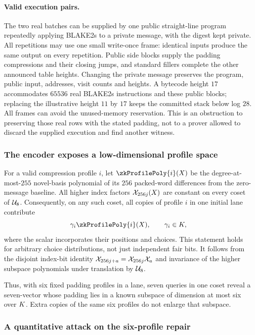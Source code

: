 \paragraph{Valid execution pairs.} The two real batches can be supplied by one public straight-line program repeatedly applying BLAKE2s to a private message, with the digest kept private. All repetitions may use one small write-once frame: identical inputs produce the same output on every repetition. Public side blocks supply the padding compressions and their closing jumps, and standard fillers complete the other announced table heights. Changing the private message preserves the program, public input, addresses, visit counts and heights. A bytecode height $17$ accommodates $65536$ real BLAKE2s instructions and these public blocks; replacing the illustrative height $11$ by $17$ keeps the committed stack below log $28$. All frames can avoid the unused-memory reservation. This is an obstruction to preserving those real rows with the stated padding, not to a prover allowed to discard the supplied execution and find another witness.

\subsubsection{The encoder exposes a low-dimensional profile space}

For a valid compression profile $i$, let $\zkProfilePoly{i}(X)$ be the degree-at-most-$255$ novel-basis polynomial of its $256$ packed-word differences from the zero-message baseline. All higher index factors $\mathcal{X}_{256j}(X)$ are constant on every coset of $\mathcal{U}_8$. Consequently, on any such coset, all copies of profile $i$ in one initial lane contribute
\[
 \gamma_i\zkProfilePoly{i}(X),\qquad \gamma_i\in\K,
\]
where the scalar incorporates their positions and choices. This statement holds for arbitrary choice distributions, not just independent fair bits. It follows from the disjoint index-bit identity $\mathcal{X}_{256j+a}=\mathcal{X}_{256j}\mathcal{X}_a$ and invariance of the higher subspace polynomials under translation by $\mathcal{U}_8$.

Thus, with six fixed padding profiles in a lane, seven queries in one coset reveal a seven-vector whose padding lies in a known subspace of dimension at most six over $K$. Extra copies of the same six profiles do not enlarge that subspace.

\subsubsection{A quantitative attack on the six-profile repair}

